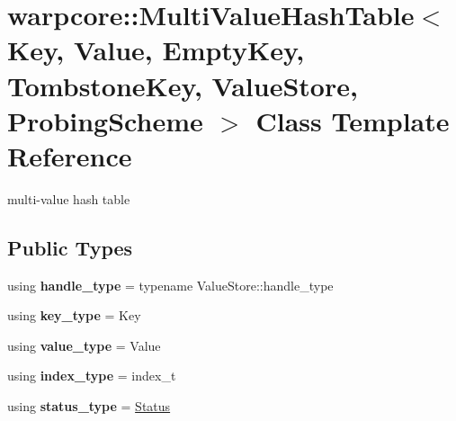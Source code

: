 \hypertarget{classwarpcore_1_1MultiValueHashTable}{}\section{warpcore\+:\+:Multi\+Value\+Hash\+Table$<$ Key, Value, Empty\+Key, Tombstone\+Key, Value\+Store, Probing\+Scheme $>$ Class Template Reference}
\label{classwarpcore_1_1MultiValueHashTable}


multi-\/value hash table  


\subsection*{Public Types}
\begin{DoxyCompactItemize}
\item 
\mbox{\label{classwarpcore_1_1MultiValueHashTable_af46ee82600628afeb0988c1ec4d3203c}} 
using {\bfseries handle\+\_\+type} = typename Value\+Store\+::handle\+\_\+type
\item 
\mbox{\label{classwarpcore_1_1MultiValueHashTable_a2da086ce905f50ba58c806812ea179fd}} 
using {\bfseries key\+\_\+type} = Key
\item 
\mbox{\label{classwarpcore_1_1MultiValueHashTable_add282b12c447be7bcaa900973d4dcc00}} 
using {\bfseries value\+\_\+type} = Value
\item 
\mbox{\label{classwarpcore_1_1MultiValueHashTable_ab36b837a73806030a953e93a7fdcfd34}} 
using {\bfseries index\+\_\+type} = index\+\_\+t
\item 
\mbox{\label{classwarpcore_1_1MultiValueHashTable_a2f23f98c0b1ae9052c323cd02d565a83}} 
using {\bfseries status\+\_\+type} = \hyperlink{classwarpcore_1_1Status}{Status}
\end{DoxyCompactItemize}
